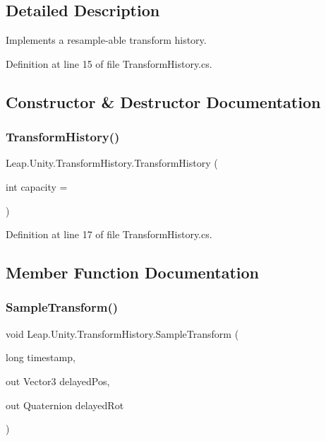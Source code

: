 \subsection{Detailed Description}
Implements a resample-\/able transform history. 



Definition at line 15 of file Transform\+History.\+cs.



\subsection{Constructor \& Destructor Documentation}
\mbox{\label{class_leap_1_1_unity_1_1_transform_history_afde8bfc49828526da6fa6460346f8304}} 
\subsubsection{\texorpdfstring{TransformHistory()}{TransformHistory()}}
{\footnotesize\ttfamily Leap.\+Unity.\+Transform\+History.\+Transform\+History (\begin{DoxyParamCaption}\item[{int}]{capacity = {} }\end{DoxyParamCaption})}



Definition at line 17 of file Transform\+History.\+cs.



\subsection{Member Function Documentation}
\mbox{\label{class_leap_1_1_unity_1_1_transform_history_a027228e6fa5c86fb1c42c0afbc465b04}} 
\subsubsection{\texorpdfstring{SampleTransform()}{SampleTransform()}}
{\footnotesize\ttfamily void Leap.\+Unity.\+Transform\+History.\+Sample\+Transform (\begin{DoxyParamCaption}\item[{long}]{timestamp,  }\item[{out Vector3}]{delayed\+Pos,  }\item[{out Quaternion}]{delayed\+Rot }\end{DoxyParamCaption})}



